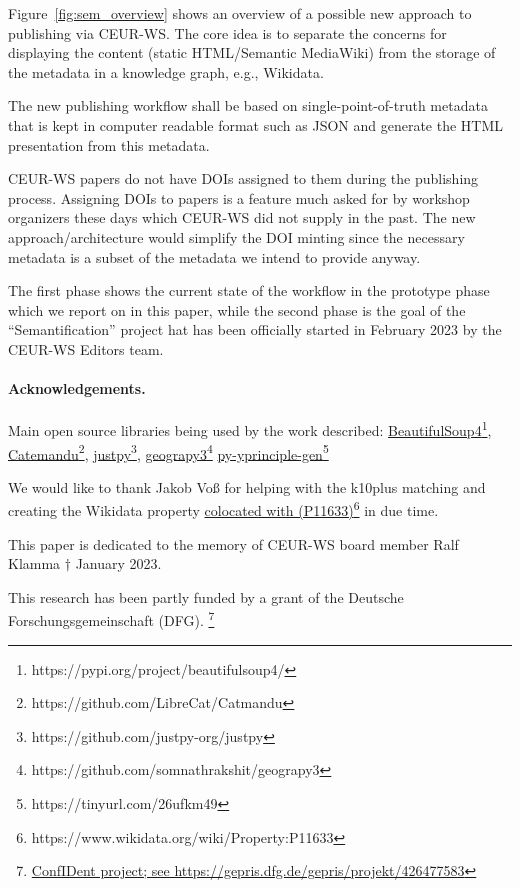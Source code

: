 \documentclass[]{ceurart}
\newcommand{\tquote}[1]{``#1''}
\newcommand{\footnotelink}[2]{\href{#1}{#2}\footnote{#1}}
\newcommand{\wdp}[2]{\footnotelink{https://www.wikidata.org/wiki/Property:#2}{#1 (#2)}}
\newif\ifreview\reviewfalse
\newcommand{\hiddenfootnotelink}[3]{\footnotelink{#2}{#3}}
\newcommand{\hiddenfootnotelink}[3]{\footnotelink{#1}{#3}}
\begin{document}
Figure~\ref{fig:sem_overview} shows an overview of a possible new approach to publishing via CEUR-WS. The core idea is to separate the concerns for displaying the content (static HTML/Semantic MediaWiki) from the storage of the metadata in a knowledge graph, e.g., Wikidata. 

The new publishing workflow shall be based on single-point-of-truth metadata that is kept in computer readable format such as JSON and generate the HTML presentation from this metadata. 

CEUR-WS papers do not have DOIs assigned to them during the publishing process. Assigning DOIs to papers is a feature much asked for by workshop organizers these days which CEUR-WS did not supply in the past. The new approach/architecture would simplify the DOI minting since the necessary metadata is a subset of the metadata we intend to provide anyway.

The first phase shows the current state of the workflow in the prototype phase which we report on in this paper, while the second phase is the goal of the \tquote{Semantification} project hat has been officially started in February 2023 by the CEUR-WS Editors team. 

\ifreview
\else
\paragraph{Acknowledgements.}
Main open source libraries being used by the work described:
\footnotelink{https://pypi.org/project/beautifulsoup4/}{BeautifulSoup4}, \footnotelink{https://github.com/LibreCat/Catmandu}{Catemandu}, \footnotelink{https://github.com/justpy-org/justpy}{justpy}, \footnotelink{https://github.com/somnathrakshit/geograpy3}{geograpy3}
\hiddenfootnotelink{https://github.com/WolfgangFahl/py-yprinciple-gen}{https://tinyurl.com/26ufkm49}{py-yprinciple-gen}

We would like to thank Jakob Voß for helping with the k10plus matching and creating the Wikidata property \wdp{colocated with}{P11633} in due time.

This paper is dedicated to the memory of CEUR-WS board member Ralf Klamma $\dag$ January 2023.

This research has been partly funded by a grant of the Deutsche Forschungsgemeinschaft (DFG). \footnote{\href{https://gepris.dfg.de/gepris/projekt/426477583}{ConfIDent project; see https://gepris.dfg.de/gepris/projekt/426477583}}
\fi

\end{document}
